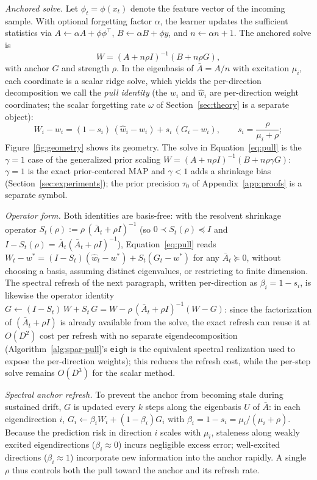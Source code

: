 \documentclass[twoside,11pt]{article}
\begin{document}
\emph{Anchored solve.}
\label{sec:method-solve}
Let $\phi_t = \phi(x_t)$ denote the feature vector of the incoming sample.
With optional forgetting factor $\alpha$, the learner updates the sufficient statistics via $A \leftarrow \alpha A + \phi\phi^\top$, $B \leftarrow \alpha B + \phi y$, and $n \leftarrow \alpha n + 1$.
The anchored solve is
\[
  W = (A + n\rho I)^{-1}(B + n\rho G),
\]
with anchor $G$ and strength $\rho$.
In the eigenbasis of $\bar A = A/n$ with excitation $\mu_i$, each coordinate is a scalar ridge solve, which yields the per-direction decomposition we call the \emph{pull identity} (the $w_i$ and $\widehat w_i$ are per-direction weight coordinates; the scalar forgetting rate $\omega$ of Section~\ref{sec:theory} is a separate object):
\begin{equation}
\label{eq:pull}
  W_i - w_i = (1-s_i)\,(\widehat w_i - w_i) + s_i\,(G_i - w_i),
  \qquad s_i = \frac{\rho}{\mu_i + \rho};
\end{equation}
Figure~\ref{fig:geometry} shows its geometry.
The solve in Equation~\eqref{eq:pull} is the $\gamma = 1$ case of the generalized prior scaling $W = (A + n\rho I)^{-1}(B + n\rho\gamma G)$: $\gamma = 1$ is the exact prior-centered MAP and $\gamma < 1$ adds a shrinkage bias (Section~\ref{sec:experiments}); the prior precision $\tau_0$ of Appendix~\ref{app:proofs} is a separate symbol.

\emph{Operator form.}
Both identities are basis-free: with the resolvent shrinkage operator $S_t(\rho) := \rho\,(\bar A_t + \rho I)^{-1}$ (so $0 \prec S_t(\rho) \preceq I$ and $I - S_t(\rho) = \bar A_t(\bar A_t + \rho I)^{-1}$), Equation~\eqref{eq:pull} reads $W_t - w^* = (I - S_t) (\widehat w_t - w^*) + S_t (G_t - w^*)$ for any $\bar A_t \succeq 0$, without choosing a basis, assuming distinct eigenvalues, or restricting to finite dimension.
The spectral refresh of the next paragraph, written per-direction as $\beta_i = 1 - s_i$, is likewise the operator identity $G \leftarrow (I - S_t)\,W + S_t\,G = W - \rho\,(\bar A_t + \rho I)^{-1}(W - G)$: since the factorization of $(\bar A_t + \rho I)$ is already available from the solve, the exact refresh can reuse it at $O(D^2)$ cost per refresh with no separate eigendecomposition (Algorithm~\ref{alg:spar-pull}'s \texttt{eigh} is the equivalent spectral realization used to expose the per-direction weights); this reduces the refresh cost, while the per-step solve remains $O(D^3)$ for the scalar method.

\emph{Spectral anchor refresh.}
To prevent the anchor from becoming stale during sustained drift, $G$ is updated every $k$ steps along the eigenbasis $U$ of $\bar A$: in each eigendirection $i$, $G_{i} \leftarrow \beta_i W_{i} + (1-\beta_i) G_{i}$ with $\beta_i = 1 - s_i = \mu_i/(\mu_i + \rho)$.
Because the prediction risk in direction $i$ scales with $\mu_i$, staleness along weakly excited eigendirections ($\beta_i \approx 0$) incurs negligible excess error; well-excited directions ($\beta_i \approx 1$) incorporate new information into the anchor rapidly.
A single $\rho$ thus controls both the pull toward the anchor and its refresh rate.
\end{document}
